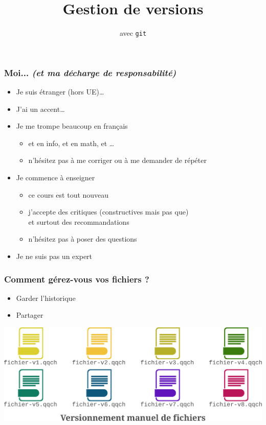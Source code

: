 \documentclass[table,tikz,12pt,svgnames]{beamer}
\title{\LARGE Gestion de versions}
\subtitle{avec \texttt{git}}
\date{}
\begin{document}
\begin{frame}
	\titlepage
\end{frame}

\begin{frame}
	\frametitle{Moi... \textit{\small (et ma décharge de responsabilité)}}
	\begin{itemize}
		\item Je suis étranger (hors UE)…
		\item J'ai un accent…
		\item Je me {\color{blue} trompe beaucoup} en français
		\begin{itemize}
			\item et en info, et en math, et \ldots
			\item n'hésitez pas à me corriger ou à me demander de répéter
		\end{itemize}
		\item Je commence à enseigner
		\begin{itemize}
			\item ce cours est tout nouveau
			\item j'accepte des critiques (constructives mais pas que)\\
			et surtout des recommandations
			\item n'hésitez pas à poser des questions
		\end{itemize}
		\item Je ne suis pas un expert
	\end{itemize}
\end{frame}


\begin{frame}
	\frametitle{Comment gérez-vous vos fichiers ?}
	\vspace{-1em}
	\begin{block}{}
	\begin{itemize}
		\item Garder l'historique
		\item Partager
	\end{itemize}
	\end{block}
	\vspace{-2em}
	\PAUSE
	\begin{block}{}
    \begin{adjustwidth}{-0.5cm}{-0.5cm}{}
		\begin{center}	
		{\includegraphics[scale=0.5]{images/file_versions.pdf}}
		\end{center}
	\end{adjustwidth}
	\end{block}
\end{frame}
\end{document}
